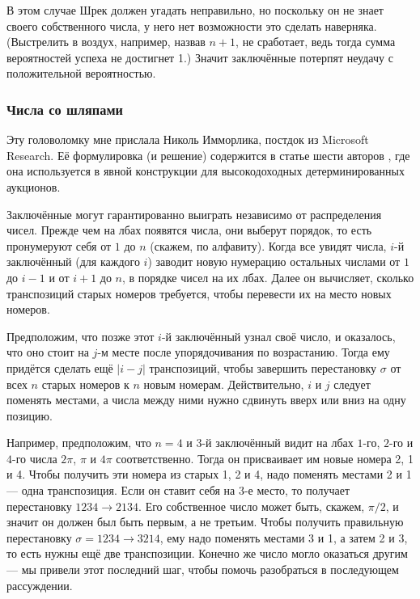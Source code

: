 В этом случае Шрек должен угадать неправильно, но поскольку он не знает своего собственного числа, у него нет возможности это сделать наверняка.
(Выстрелить в воздух, например, назвав $n + 1$, не сработает, ведь тогда сумма вероятностей успеха не достигнет 1.)
Значит заключённые потерпят неудачу с положительной вероятностью.

\subsubsection*{Числа со шляпами}

Эту головоломку мне прислала Николь Имморлика, постдок из Microsoft Research.
Её формулировка (и решение) содержится в статье шести авторов \cite{1}, где она используется в явной конструкции для высокодоходных детерминированных аукционов.

Заключённые могут гарантированно выиграть независимо от распределения чисел.
Прежде чем на лбах появятся числа, они выберут порядок, то есть пронумеруют себя от $1$ до $n$ (скажем, по алфавиту).
Когда все увидят числа, $i$-й заключённый (для каждого $i$) заводит новую нумерацию остальных числами от $1$ до $i - 1$ и от $i + 1$ до $n$, в порядке чисел на их лбах.
Далее он вычисляет, сколько транспозиций старых номеров требуется, чтобы перевести их на место новых номеров.

Предположим, что позже этот $i$-й заключённый узнал своё число, и оказалось, что оно стоит на $j$-м месте после упорядочивания по возрастанию.
Тогда ему придётся сделать ещё $|i - j|$ транспозиций, чтобы завершить перестановку $\sigma$ от всех $n$ старых номеров к $n$ новым номерам.
Действительно, $i$ и $j$ следует поменять местами, а числа между ними нужно сдвинуть вверх или вниз на одну позицию.

Например, предположим, что $n = 4$ и $3$-й заключённый видит на лбах $1$-го, $2$-го и $4$-го числа $2\pi$, $\pi$ и $4\pi$ соответственно.
Тогда он присваивает им новые номера 2, 1 и 4.
Чтобы получить эти номера из старых 1, 2 и 4, надо поменять местами 2 и 1 --- одна транспозиция.
Если он ставит себя на 3-е место, то получает перестановку $1234 \to  2134$.
Его собственное число может быть, скажем, $\pi/2$, и значит он должен был быть первым, а не третьим.
Чтобы получить правильную перестановку  $\sigma  = 1234 \to  3214$, ему надо поменять местами 3 и 1, а затем 2 и 3, то есть нужны ещё две транспозиции.
Конечно же число могло оказаться другим --- мы привели этот последний шаг, чтобы помочь разобраться в последующем  рассуждении.

